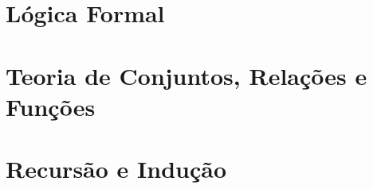 \documentclass[a4paper]{book}
\theoremstyle{definition}
\begin{document}
\tableofcontents

\mainmatter



%

\part{L\'ogica Formal}






\part{Teoria de Conjuntos, Relações e Funções}






\part{Recursão e Indução}





\appendix
{}



\end{document}
